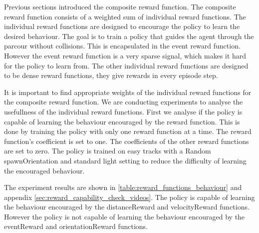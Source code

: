 Previous sections introduced the composite reward function. The composite reward function consists of a weighted sum of individual reward functions. The individual reward functions are designed to encourage the policy to learn the desired behaviour. The goal is to train a policy that guides the agent through the parcour without collisions. This is encapsulated in the event reward function. However the event reward function is a very sparse signal, which makes it hard for the policy to learn from. The other individual reward functions are designed to be dense reward functions, they give rewards in every episode step.


It is important to find appropriate weights of the individual reward functions for the composite reward function. We are conducting experiments to analyse the usefullness of the individual reward functions. First we analyse if the policy is capable of learning the behaviour encouraged by the reward function.
This is done by training the policy with only one reward function at a time. The reward function's coefficient is set to one. The coefficients of the other reward functions are set to zero. The policy is trained on easy tracks with a Random spawnOrientation and standard light setting to reduce the difficulty of learning the encouraged behaviour.


The experiment results are shown in \ref{table:reward_functions_behaviour} and appendix \ref{sec:reward_capability_check_videos}. The policy is capable of learning the behaviour encouraged by the distanceReward and velocityReward functions. However the policy is not capable of learning the behaviour encouraged by the eventReward and orientationReward functions.


